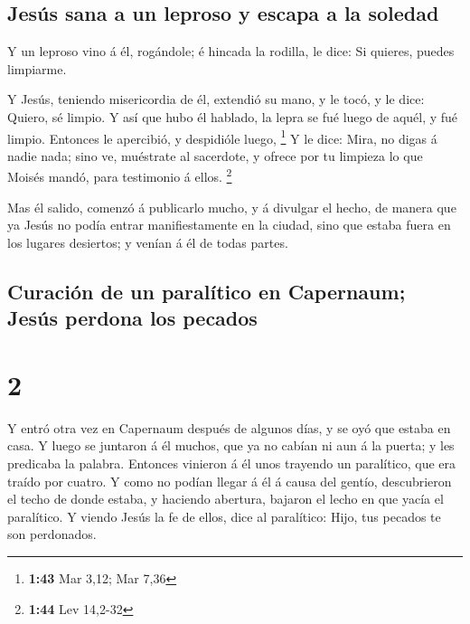 \hypertarget{jesuxfas-sana-a-un-leproso-y-escapa-a-la-soledad}{%
\subsection{Jesús sana a un leproso y escapa a la
soledad}\label{jesuxfas-sana-a-un-leproso-y-escapa-a-la-soledad}}

 Y un leproso vino á él, rogándole; é hincada la rodilla,
le dice: Si quieres, puedes limpiarme.

 Y Jesús, teniendo misericordia de él, extendió su mano,
y le tocó, y le dice: Quiero, sé limpio.  Y así que hubo
él hablado, la lepra se fué luego de aquél, y fué limpio.
 Entonces le apercibió, y despidióle luego, \footnote{\textbf{1:43}
  Mar 3,12; Mar 7,36}  Y le dice: Mira, no digas á nadie
nada; sino ve, muéstrate al sacerdote, y ofrece por tu limpieza lo que
Moisés mandó, para testimonio á ellos. \footnote{\textbf{1:44} Lev
  14,2-32}

 Mas él salido, comenzó á publicarlo mucho, y á divulgar
el hecho, de manera que ya Jesús no podía entrar manifiestamente en la
ciudad, sino que estaba fuera en los lugares desiertos; y venían á él de
todas partes.

\hypertarget{curaciuxf3n-de-un-paraluxedtico-en-capernaum-jesuxfas-perdona-los-pecados}{%
\subsection{Curación de un paralítico en Capernaum; Jesús perdona los
pecados}\label{curaciuxf3n-de-un-paraluxedtico-en-capernaum-jesuxfas-perdona-los-pecados}}

\hypertarget{section-1}{%
\section{2}\label{section-1}}

 Y entró otra vez en Capernaum después de algunos días, y
se oyó que estaba en casa.  Y luego se juntaron á él
muchos, que ya no cabían ni aun á la puerta; y les predicaba la palabra.
 Entonces vinieron á él unos trayendo un paralítico, que
era traído por cuatro.  Y como no podían llegar á él á
causa del gentío, descubrieron el techo de donde estaba, y haciendo
abertura, bajaron el lecho en que yacía el paralítico.  Y
viendo Jesús la fe de ellos, dice al paralítico: Hijo, tus pecados te
son perdonados.

